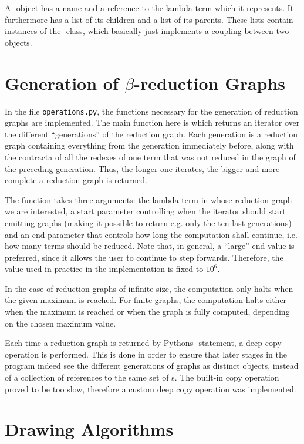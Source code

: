 A -object has a name and a reference to the lambda term which it
represents. It furthermore has a list of its children and a list of its
parents. These lists contain instances of the -class, which
basically just implements a coupling between two -objects.

\section{Generation of $\beta$-reduction Graphs}

In the file \texttt{operations.py}, the functions necessary for the generation
of reduction graphs are implemented. The main function here is
 which returns an iterator over the different
``generations'' of the reduction graph. Each generation is a reduction graph
containing everything from the generation immediately before, along with the
contracta of all the redexes of one term that was not reduced in the graph of
the preceding generation. Thus, the longer one iterates, the bigger and more
complete a reduction graph is returned. 

The function takes three arguments: the lambda term in whose reduction graph
we are interested, a start parameter controlling when the iterator should
start emitting graphs (making it possible to return e.g. only the ten last
generations) and an end parameter that controls how long the computation shall
continue, i.e. how many terms should be reduced. Note that, in general, a
``large'' end value is preferred, since it allows the user to continue to step
forwards. Therefore, the value used in practice in the implementation is fixed
to $10^6$.

In the case of reduction graphs of infinite size, the computation only halts
when the given maximum is reached. For finite graphs, the computation halts
either when the maximum is reached or when the graph is fully computed,
depending on the chosen maximum value.

Each time a reduction graph is returned by Pythons -statement, a
deep copy operation is performed. This is done in order to ensure that later
stages in the program indeed see the different generations of graphs as
distinct objects, instead of a collection of references to the same set of
s. The built-in copy operation  proved to
be too slow, therefore a custom deep copy operation was implemented.

\section{Drawing Algorithms}

